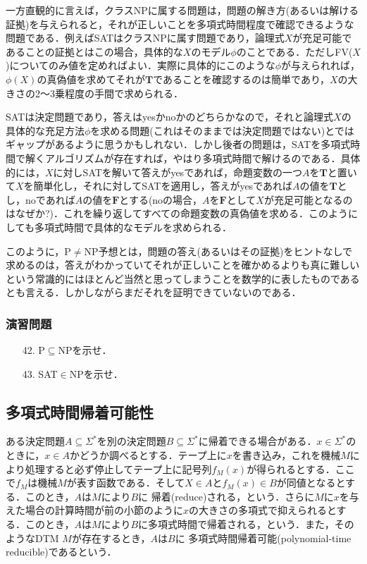 \documentclass{ltjsarticle}
\theoremstyle{mystyle1}
\theoremstyle{mystyle2}
\newcommand{\bT}{\ensuremath{\mathbf{T}}}
\newcommand{\bF}{\ensuremath{\mathbf{F}}}
\newcommand{\red}[1]{{\color{red} #1}}
\begin{document}
一方直観的に言えば，クラスNPに属する問題は，問題の解き方(あるいは解ける証拠)を与えられると，それが正しいことを多項式時間程度で確認できるような問題である．例えばSATはクラスNPに属す問題であり，論理式$X$が充足可能であることの証拠とはこの場合，具体的な$X$のモデル$\phi$のことである．ただしFV($X$)についてのみ値を定めればよい．実際に具体的にこのような$\phi$が与えられれば，$\phi\left(X\right)$の真偽値を求めてそれが$\bT$であることを確認するのは簡単であり，$X$の大きさの2～3乗程度の手間で求められる．

SATは決定問題であり，答えはyesかnoかのどちらかなので，それと論理式$X$の具体的な充足方法$\phi$を求める問題(これはそのままでは決定問題ではない)とではギャップがあるように思うかもしれない．しかし後者の問題は，SATを多項式時間で解くアルゴリズムが存在すれば，やはり多項式時間で解けるのである．具体的には，$X$に対しSATを解いて答えがyesであれば，命題変数の一つ$A$を$\bT$と置いて$X$を簡単化し，それに対してSATを適用し，答えがyesであれば$A$の値を$\bT$とし，noであれば$A$の値を$\bF$とする(noの場合，$A$を$\bF$として$X$が充足可能となるのはなぜか?)．これを繰り返してすべての命題変数の真偽値を求める．このようにしても多項式時間で具体的なモデルを求められる．

このように，P$\neq$NP予想とは，問題の答え(あるいはその証拠)をヒントなしで求めるのは，答えがわかっていてそれが正しいことを確かめるよりも真に難しいという常識的にはほとんど当然と思ってしまうことを数学的に表したものであるとも言える．しかしながらまだそれを証明できていないのである．
\subsubsection*{演習問題}
\begin{enumerate}
  \item[42.] P$\subseteq$NPを示せ．
  \item[43.] SAT$\in$NPを示せ．
\end{enumerate}
\subsection{多項式時間帰着可能性}
ある決定問題$A\subseteq\Sigma^\ast$を別の決定問題$B\subseteq\Sigma^\ast$に帰着できる場合がある．$x\in\Sigma^\ast$のときに，$x\in A$かどうか調べるとする．テープ上に$x$を書き込み，これを機械$M$により処理すると必ず停止してテープ上に記号列$f_M \left(x\right)$が得られるとする．ここで$f_M$は機械$M$が表す函数である．そして$X\in A$と$f_M\left(x\right)\in B$が同値となるとする．このとき，$A$は$M$により$B$に\red{帰着}(reduce)される，という．さらに$M$に$x$を与えた場合の計算時間が前の小節のように$x$の大きさの多項式で抑えられるとする．このとき，$A$は$M$により$B$に多項式時間で帰着される，という．また，そのようなDTM $M$が存在するとき，$A$は$B$に\red{多項式時間帰着可能}(polynomial-time reducible)であるという．
\end{document}
